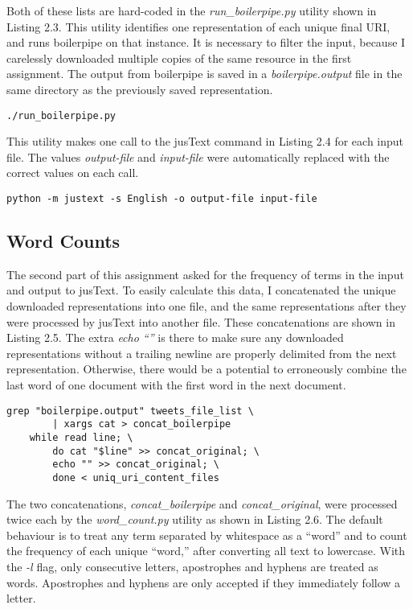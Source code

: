 \documentclass[a4paper,12pt]{article}
\begin{document}
Both of these lists are hard-coded in the \emph{run\_boilerpipe.py} utility shown in Listing 2.3. This utility
identifies one representation of each unique final URI, and runs boilerpipe on that instance. It is necessary to
filter the input, because I carelessly downloaded multiple copies of the same resource in the first assignment.
The output from boilerpipe is saved in a \emph{boilerpipe.output} file in the same directory as the previously
saved representation.

\begin{lstlisting}[basicstyle=\ttfamily,caption={Running jusText}]
    ./run_boilerpipe.py
\end{lstlisting}

This utility makes one call to the jusText command in Listing 2.4 for each input file. The values
\emph{output-file} and \emph{input-file} were automatically replaced with the correct values on each call.

\begin{lstlisting}[basicstyle=\ttfamily,caption={Actual jusText command}]
    python -m justext -s English -o output-file input-file
\end{lstlisting}

\subsection{Word Counts}
The second part of this assignment asked for the frequency of terms in the input and output to jusText. To easily
calculate this data, I concatenated the unique downloaded representations into one file, and the same representations
after they were processed by jusText into another file. These concatenations are shown in Listing 2.5. The extra
\emph{echo ``''} is there to make sure any downloaded representations without a trailing newline are properly
delimited from the next representation. Otherwise, there would be a potential to erroneously combine the last word
of one document with the first word in the next document.

\begin{lstlisting}[basicstyle=\ttfamily,caption={Concatenating input and output data.}]
    grep "boilerpipe.output" tweets_file_list \
        | xargs cat > concat_boilerpipe
    while read line; \
        do cat "$line" >> concat_original; \
        echo "" >> concat_original; \
        done < uniq_uri_content_files
\end{lstlisting}

The two concatenations, \emph{concat\_boilerpipe} and \emph{concat\_original}, were processed twice each by the
\emph{word\_count.py} utility as shown in Listing 2.6. The default behaviour is to treat any term separated by
whitespace as a ``word'' and to count the frequency of each unique ``word,'' after converting all text to
lowercase. With the \emph{-l} flag, only consecutive letters, apostrophes and hyphens are treated as words.
Apostrophes and hyphens are only accepted if they immediately follow a letter.
\end{document}
